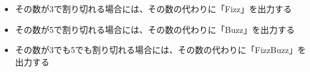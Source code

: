 \begin{itemize}
	\item その数が3で割り切れる場合には、その数の代わりに「Fizz」を出力する
	\item その数が5で割り切れる場合には、その数の代わりに「Buzz」を出力する
	\item その数が3でも5でも割り切れる場合には、その数の代わりに「FizzBuzz」を出力する
\end{itemize}
